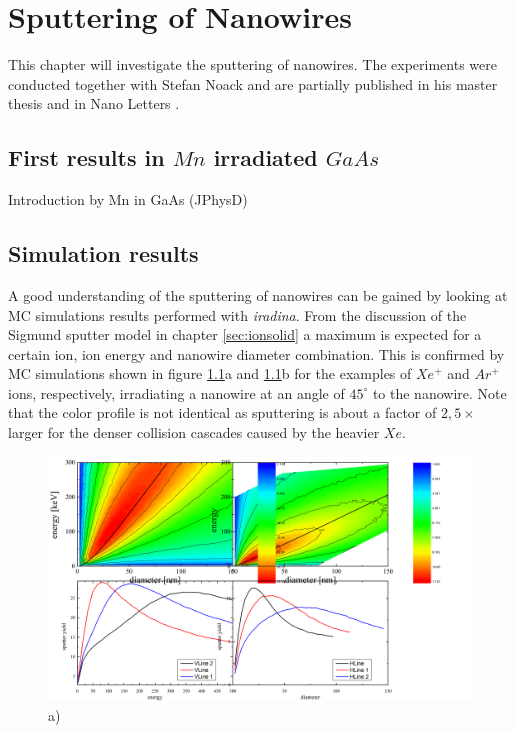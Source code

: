 \chapter{Sputtering of Nanowires}

This chapter will investigate the sputtering of nanowires. The experiments were conducted together with Stefan Noack and are partially published in his master thesis \cite{noack_sputter_2014} and in Nano Letters \cite{johannes_anomalous_2015}.

\section{First results in $Mn$ irradiated $GaAs$}

Introduction by Mn in GaAs (JPhysD)


\section{Simulation results}
\label{sec:simsputering}

A good understanding of the sputtering of nanowires can be gained by looking at MC simulations results performed with \emph{iradina}. From the discussion of the Sigmund sputter model in chapter \ref{sec:ionsolid} a maximum is expected for a certain ion, ion energy and nanowire diameter combination. This is confirmed by MC simulations shown in figure \ref{sputtering_de}a and \ref{sputtering_de}b for the examples of $Xe^+$ and $Ar^+$ ions, respectively, irradiating a nanowire at an angle of $45^\circ$ to the nanowire. Note that the color profile is not identical as sputtering is about a factor of $2,5\times$ larger for the denser collision cascades caused by the heavier $Xe$.

\begin{figure}[th]
	\centering
		\includegraphics[width=.95\textwidth]{images/sputtering_diameter_energy.png}
	\caption{a) } 
	\label{sputtering_de}
\end{figure} 


